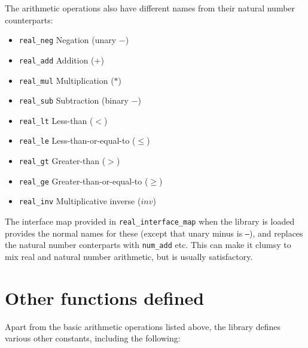 The arithmetic operations also have different names from their natural number
counterparts:

\begin{itemize}

\item{\tt real\_neg} Negation (unary $-$)

\item{\tt real\_add} Addition ($+$)

\item{\tt real\_mul} Multiplication ($*$)

\item{\tt real\_sub} Subtraction (binary $-$)

\item{\tt real\_lt} Less-than ($<$)

\item{\tt real\_le} Less-than-or-equal-to ($\leq$)

\item{\tt real\_gt} Greater-than ($>$)

\item{\tt real\_ge} Greater-than-or-equal-to ($\geq$)

\item{\tt real\_inv} Multiplicative inverse ($inv$)

\end{itemize}

The interface map provided in {\tt real\_interface\_map} when the library is
loaded provides the normal names for these (except that unary minus is
{\tt --}), and replaces the natural number conterparts with {\tt num\_add} etc.
This can make it clumsy to mix real and natural number arithmetic, but is
usually satisfactory.

\section{Other functions defined}

Apart from the basic arithmetic operations listed above, the library defines
various other constants, including the following:

